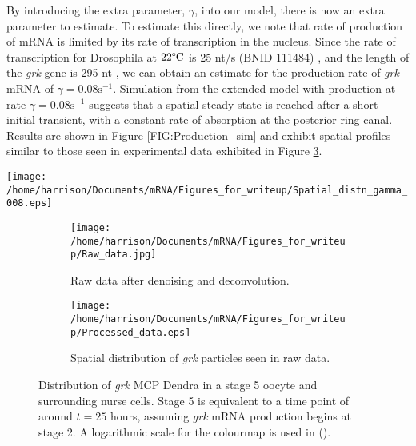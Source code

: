 \documentclass[twocolumn]{biophys}
\begin{document}
By introducing the extra parameter, $\gamma$, into our model, there is now an extra parameter to estimate. 
To estimate this directly, we note that rate of production of mRNA is limited by its rate of transcription in the nucleus.
Since the rate of transcription for Drosophila at $22 \degree \text{C}$ is 25 nt/s (BNID 111484) \citep{milo2010bionumbers}, and the length of the \textit{grk} gene is 295 nt \cite{marygold2013flybase}, we can obtain an estimate for the production rate of \textit{grk} mRNA of $\gamma = 0.08 \text{s}^{-1}$.
Simulation from the extended model with production at rate $\gamma=0.08 \text{s}^{-1}$ suggests that a spatial steady state is reached after a short initial transient, with a constant rate of absorption at the posterior ring canal.
Results are shown in Figure \ref{FIG:Production_sim} and exhibit spatial profiles similar to those seen in experimental data exhibited in Figure \ref{FIG:Raw_and_processed_data}.
\begin{figure*}
 \centering
 \texttt{[image: /home/harrison/Documents/mRNA/Figures\_for\_writeup/Spatial\_distn\_gamma\_008.eps]}
 \caption{The spatial distribution evolving over time up to 25 hours from a single simulation of the model with production included and parameters of $\phi=0.58$, $\nu_1=1.16 \mu \text{ms}^{-1}$, $\nu_2=0.8 \mu \text{ms}^{-1}$, $\omega_1=0.42 \text{s}^{-1}$, $\omega_2=0.84 \text{s}^{-1}$, $\lambda=0.11 \text{s}^{-1}$, $\gamma = 0.08 \text{s}^{-1}$. 
 A logarithmic scale for the colourmap is used to emphasise the presence of small numbers of particles in the nurse cell.}
 \label{FIG:Production_sim}
\end{figure*}

\begin{figure} 
        \centering
        \begin{subfigure}[h]{0.76\columnwidth}
                \texttt{[image: /home/harrison/Documents/mRNA/Figures\_for\_writeup/Raw\_data.jpg]}
                \caption{Raw data after denoising and deconvolution.}
                \label{fig:aa}
        \end{subfigure}%
        
        
        \begin{subfigure}[h]{0.86\columnwidth}
                \texttt{[image: /home/harrison/Documents/mRNA/Figures\_for\_writeup/Processed\_data.eps]}
                \caption{Spatial distribution of \textit{grk} particles seen in raw data.}
                \label{fig:bb}
        \end{subfigure}
        
        \caption{Distribution of \textit{grk} MCP Dendra in a stage 5  oocyte and surrounding nurse cells. Stage 5 is equivalent to a time point of around $t=25$ hours, assuming \textit{grk} mRNA production begins at stage 2. A logarithmic scale for the colourmap is used in ().}
        \label{FIG:Raw_and_processed_data}
\end{figure}
\end{document}
